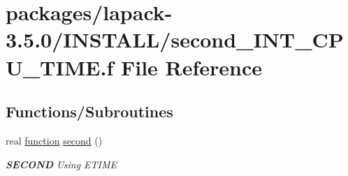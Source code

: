 \hypertarget{second__INT__CPU__TIME_8f}{}\section{packages/lapack-\/3.5.0/\+I\+N\+S\+T\+A\+L\+L/second\+\_\+\+I\+N\+T\+\_\+\+C\+P\+U\+\_\+\+T\+I\+M\+E.f File Reference}
\label{second__INT__CPU__TIME_8f}
\subsection*{Functions/\+Subroutines}
\begin{DoxyCompactItemize}
\item 
real \hyperlink{afunc_8m_a7b5e596df91eadea6c537c0825e894a7}{function} \hyperlink{group__auxOTHERauxiliary_gae9f971a8b343bd2fcb85c3b16da97f10}{second} ()
\begin{DoxyCompactList}\small\item\em {\bfseries S\+E\+C\+O\+N\+D} Using E\+T\+I\+M\+E \end{DoxyCompactList}\end{DoxyCompactItemize}
